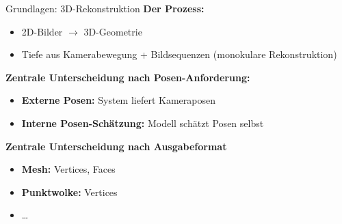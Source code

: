 \begin{frame}{Grundlagen: 3D-Rekonstruktion}{\cite{HERRERAGRANDA2024e37356, sun2021neuralreconrealtimecoherent3d, gao2023visfusionvisibilityawareonline3d, murai2025mast3rslamrealtimedenseslam, liu2025slam3rrealtimedensescene}}
    \textbf{Der Prozess:}
    \begin{itemize}
        \item 2D-Bilder $\rightarrow$ 3D-Geometrie
        \item Tiefe aus Kamerabewegung + Bildsequenzen (monokulare Rekonstruktion)
    \end{itemize}
    
    \vspace{0.8em}
    \textbf{Zentrale Unterscheidung nach Posen-Anforderung:}
    \begin{itemize}
        \item \textbf{Externe Posen:} System liefert Kameraposen
        \item \textbf{Interne Posen-Schätzung:} Modell schätzt Posen selbst
    \end{itemize}
    
    \vspace{0.8em}
    \textbf{Zentrale Unterscheidung nach Ausgabeformat}
    \begin{itemize}
        \item \textbf{Mesh:} Vertices, Faces
        \item \textbf{Punktwolke:} Vertices
        \item \dots
    \end{itemize}
\end{frame}

        
